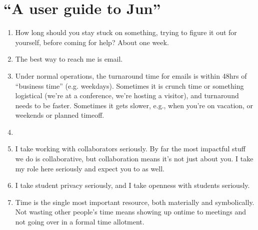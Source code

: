 \documentclass[letterpaper,10pt,english]{sphinxmanual}
\begin{document}
\section{“A user guide to Jun”}
\label{\detokenize{06UserGuideToJun:a-user-guide-to-jun}}\begin{enumerate}
%
\item {} 
\sphinxAtStartPar
How long should you stay stuck on something, trying to figure it out for yourself, before coming for help? About one week.

\item {} 
\sphinxAtStartPar
The best way to reach me is e\sphinxhyphen{}mail.

\item {} 
\sphinxAtStartPar
Under normal operations, the turnaround time for e\sphinxhyphen{}mails is within 48hrs of “business time” (e.g. weekdays). Sometimes it is crunch time or something logistical (we’re at a conference, we’re hosting a visitor), and turnaround needs to be faster. Sometimes it gets slower, e.g., when you’re on vacation, or weekends or planned time\sphinxhyphen{}off.

\item {} 
\sphinxAtStartPar
{}

\item {} 
\sphinxAtStartPar
I take working with collaborators seriously.  By far the most impactful stuff we do is collaborative, but collaboration means it’s not just about you. I take my role here seriously and expect you to as well.

\item {} 
\sphinxAtStartPar
I take student privacy seriously, and I take openness with students seriously.

\item {} 
\sphinxAtStartPar
Time is the single most important resource, both materially and symbolically. Not wasting other people’s time means showing up on\sphinxhyphen{}time to meetings and not going over in a formal time allotment.

\end{enumerate}
\end{document}
